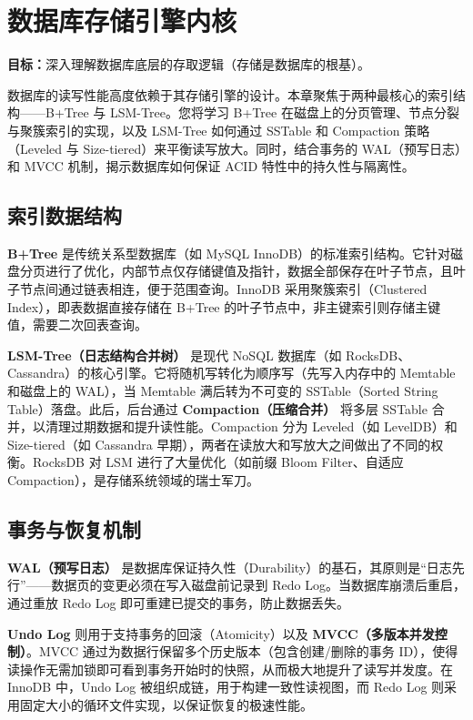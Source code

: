 \documentclass[12pt,UTF8]{ctexbook}
\begin{document}
	\chapter{数据库存储引擎内核}
	\textbf{目标：}深入理解数据库底层的存取逻辑（存储是数据库的根基）。
	
	数据库的读写性能高度依赖于其存储引擎的设计。本章聚焦于两种最核心的索引结构——B+Tree 与 LSM-Tree。您将学习 B+Tree 在磁盘上的分页管理、节点分裂与聚簇索引的实现，以及 LSM-Tree 如何通过 SSTable 和 Compaction 策略（Leveled 与 Size-tiered）来平衡读写放大。同时，结合事务的 WAL（预写日志）和 MVCC 机制，揭示数据库如何保证 ACID 特性中的持久性与隔离性。
	
	\section{索引数据结构}
	
	\textbf{B+Tree} 是传统关系型数据库（如 MySQL InnoDB）的标准索引结构。它针对磁盘分页进行了优化，内部节点仅存储键值及指针，数据全部保存在叶子节点，且叶子节点间通过链表相连，便于范围查询。InnoDB 采用聚簇索引（Clustered Index），即表数据直接存储在 B+Tree 的叶子节点中，非主键索引则存储主键值，需要二次回表查询。
	
	\textbf{LSM-Tree（日志结构合并树）} 是现代 NoSQL 数据库（如 RocksDB、Cassandra）的核心引擎。它将随机写转化为顺序写（先写入内存中的 Memtable 和磁盘上的 WAL），当 Memtable 满后转为不可变的 SSTable（Sorted String Table）落盘。此后，后台通过 \textbf{Compaction（压缩合并）} 将多层 SSTable 合并，以清理过期数据和提升读性能。Compaction 分为 Leveled（如 LevelDB）和 Size-tiered（如 Cassandra 早期），两者在读放大和写放大之间做出了不同的权衡。RocksDB 对 LSM 进行了大量优化（如前缀 Bloom Filter、自适应 Compaction），是存储系统领域的瑞士军刀。
	
	\section{事务与恢复机制}
	
	\textbf{WAL（预写日志）} 是数据库保证持久性（Durability）的基石，其原则是“日志先行”——数据页的变更必须在写入磁盘前记录到 Redo Log。当数据库崩溃后重启，通过重放 Redo Log 即可重建已提交的事务，防止数据丢失。
	
	\textbf{Undo Log} 则用于支持事务的回滚（Atomicity）以及 \textbf{MVCC（多版本并发控制）}。MVCC 通过为数据行保留多个历史版本（包含创建/删除的事务 ID），使得读操作无需加锁即可看到事务开始时的快照，从而极大地提升了读写并发度。在 InnoDB 中，Undo Log 被组织成链，用于构建一致性读视图，而 Redo Log 则采用固定大小的循环文件实现，以保证恢复的极速性能。
	
\end{document}
